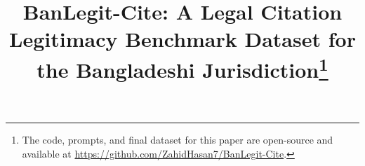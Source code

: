 \documentclass[conference]{IEEEtran}
\begin{document}
\title{BanLegit-Cite: A Legal Citation Legitimacy Benchmark Dataset for the Bangladeshi Jurisdiction\thanks{The code, prompts, and final dataset for this paper are open-source and available at \href{https://github.com/ZahidHasan7/BanLegit-Cite}{https://github.com/ZahidHasan7/BanLegit-Cite}.}}

\author{
\and
{}
}

\maketitle
\end{document}
